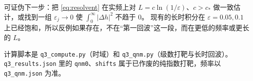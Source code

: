 \documentclass[11pt]{ctexart}
\theoremstyle{definition}
\theoremstyle{remark}
\newcommand{\eps}{\varepsilon}
\begin{document}
可证伪下一步：把 \eqref{eq:resolvent} 在实频上对 $L=c\ln(1/\eps)$、$c>c_*$ 做一致估计，或找到一组 $\eps_j\to0$ 使 $\int_0^\infty|\Delta h|^2$ 不趋于 $0$。
现有的长时积分在 $\eps=0.05,0.1$ 上已经饱和，所以反例如果存在，不在“第一回波”这一段，而在更低的频率或更长的 $L$。

计算脚本是 \texttt{q3\_compute.py}（时域）和 \texttt{q3\_qnm.py}（级数打靶与长时回波）。
\texttt{q3\_results.json} 里的 \texttt{qnm0}、\texttt{shifts} 属于已作废的纯指数打靶，频率以 \texttt{q3\_qnm.json} 为准。
\end{document}

